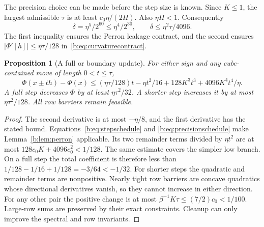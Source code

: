 \documentclass[11pt]{amsart}
\newtheorem{proposition}[theorem]{Proposition}
\theoremstyle{definition}\newtheorem{definition}[theorem]{Definition}
\theoremstyle{remark}\newtheorem{remark}[theorem]{Remark}
\numberwithin{equation}{section}
\begin{document}
The precision choice can be made before the step size is known. Since
$K\le1$, the largest admissible
$\tau$ is at least $c_0\eta/(2H)$. Also $\eta H<1$. Consequently
\begin{equation}\label{b:eq:precisionschedule}
 \delta=\eta^5/2^{60}\le\eta^4/2^{30},\qquad
 \delta\le\eta^2\tau/4096.
\end{equation}
The first inequality ensures the Perron leakage contract, and the second
ensures $|\Phi'[h]|\le\eta\tau/128$ in~\eqref{b:eq:curvaturecontract}.

\begin{proposition}[A full or boundary update]\label{b:prop:onestep}
For either sign and any cube-contained move of length $0<t\le\tau$,
\[
 \Phi(x\pm th)-\Phi(x)
 \le(\eta\tau/128)t-\eta t^2/16
                     +128K^3t^3+4096K^4t^4/\eta.
\]
A full step decreases $\Phi$ by at least $\eta\tau^2/32$.
A shorter step increases it by at most $\eta\tau^2/128$.
All row barriers remain feasible.
\end{proposition}
\begin{proof}
The second derivative is at most $-\eta/8$, and the first derivative has the
stated bound. Equations~\eqref{b:eq:stepschedule} and
\eqref{b:eq:precisionschedule} make Lemma~\ref{b:lem:perron} applicable.
Its two remainder terms divided by $\eta t^2$ are at most
$128c_0K+4096c_0^2<1/128$. The same estimate covers the simpler low branch.
On a full step the total coefficient is therefore less than
$1/128-1/16+1/128=-3/64<-1/32$.
For shorter steps the quadratic and remainder terms are nonpositive.
Nearly tight row barriers are concave quadratics whose directional
derivatives vanish, so they cannot increase in either direction. For any other pair the positive
change is at most $\beta^{-1}K\tau\le(7/2)c_0<1/100$.
Large-row sums are preserved by their exact constraints. Cleanup can only
improve the spectral and row invariants.
\end{proof}
\end{document}
